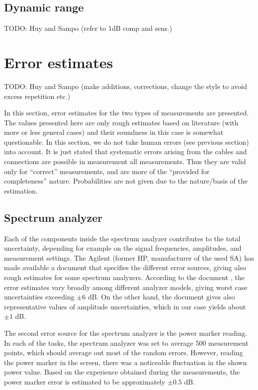 \documentclass[a4paper, 12pt]{article}
\begin{document}
\subsection{Dynamic range}

TODO: Huy and Sampo (refer to 1dB comp and sens.)


\newpage
\section{Error estimates}

TODO: Huy and Sampo (make additions, corrections, change the style to avoid excess 
repetition etc.)

In this section, error estimates for the two types of measurements are presented.
The values presented here are only rough estimates based on literature (with more 
or less general cases) and their soundness in this case is somewhat questionable. 
In this section, we do not take human errors (see previous section) into account. 
It is just stated that systematic errors arising from the cables and connections 
are possible in measurement all measurements. Thus they are valid only for 
``correct'' measurements, and are more of the ``provided for completeness'' 
nature. Probabilities are not given due to the nature/basis of the estimation.


\subsection{Spectrum analyzer}

Each of the components inside the spectrum analyzer contributes to the total uncertainty, 
depending for example on the signal frequencies, amplitudes, and measurement settings. 
The Agilent (former HP, manufacturer of the used SA) has made available a document that 
specifies the different error sources, giving also rough estimates for some spectrum 
analyzers. According to the document \cite{sa}, the error estimates vary broadly among 
different analyzer models, giving worst case uncertainties exceeding $\pm 6$ dB. On the 
other hand, the document gives also representative values of amplitude uncertainties, 
which in our case yields about $\pm 1$ dB.

The second error source for the spectrum analyzer is the power marker reading. In 
each of the tasks, the spectrum analyzer was set to average 500 measurement points, 
which should average out most of the random errors. However, reading the power marker 
in the screen, there was a noticeable fluctuation in the shown power value. Based on the 
experience obtained during the measurements, the power marker error is estimated to be 
approximately $\pm 0.5$ dB.
\end{document}

